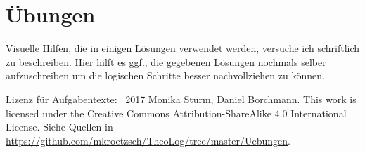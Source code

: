\section{Übungen}
{\footnotesize Visuelle Hilfen, die in einigen Lösungen verwendet werden, versuche ich schriftlich zu beschreiben. Hier hilft es ggf., die gegebenen Lösungen nochmals selber aufzuschreiben um die logischen Schritte besser nachvollziehen zu können.

Lizenz für Aufgabentexte: \textcopyright\ 2017 Monika Sturm, Daniel Borchmann. This work is licensed under the Creative Commons Attribution-ShareAlike 4.0 International License. Siehe Quellen in \url{https://github.com/mkroetzsch/TheoLog/tree/master/Uebungen}.}







